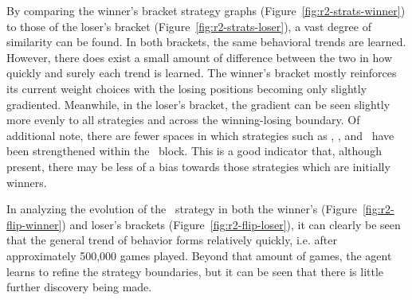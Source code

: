 By comparing the winner's bracket strategy graphs
(Figure~\ref{fig:r2-strats-winner})
to those of the loser's bracket
(Figure~\ref{fig:r2-strats-loser}),
a vast degree of similarity can be found.
%
In both brackets,
the same behavioral trends are learned.
%
However,
there does exist a small amount of difference between the two
in how quickly and surely each trend is learned.
%
The winner's bracket mostly reinforces its current weight choices
with the losing positions becoming only slightly gradiented.
%
Meanwhile,
in the loser's bracket,
the gradient can be seen slightly more evenly to all strategies
and
across the winning-losing boundary.
%
Of additional note,
there are fewer spaces in which
strategies such as \cribminavg, \peggingmaxavggained, and \peggingminavggiven\ 
have been strengthened within the \handmaxmin\ block.
%
This is a good indicator that,
although present,
there may be less of a bias towards those strategies which are initially winners.

%


In analyzing the evolution of the \handmaxavg\ strategy in both the winner's
(Figure~\ref{fig:r2-flip-winner})
and loser's brackets (Figure~\ref{fig:r2-flip-loser}),
it can clearly be seen that the general trend of behavior forms
relatively quickly,
i.e. after approximately 500,000 games played.
%
Beyond that amount of games,
the agent learns to refine the strategy boundaries,
but it can be seen that there is little further discovery being made.






%





